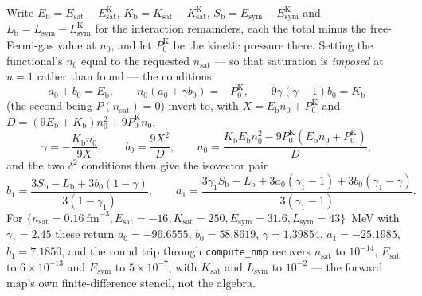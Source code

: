 \documentclass[aps,prc,onecolumn,superscriptaddress,nofootinbib,10pt]{revtex4-2}
\newcommand{\nsat}{n_{\mathrm{sat}}}
\begin{document}
Write $E_{\mathrm{b}} = E_{\mathrm{sat}} - E_{\mathrm{sat}}^{\mathrm{K}}$,
$K_{\mathrm{b}} = K_{\mathrm{sat}} - K_{\mathrm{sat}}^{\mathrm{K}}$,
$S_{\mathrm{b}} = E_{\mathrm{sym}} - E_{\mathrm{sym}}^{\mathrm{K}}$ and
$L_{\mathrm{b}} = L_{\mathrm{sym}} - L_{\mathrm{sym}}^{\mathrm{K}}$ for the
interaction remainders, each the total minus the free-Fermi-gas value at
$n_0$, and let $P^{\mathrm{K}}_0$ be the kinetic pressure there. Setting the
functional's $n_0$ equal to the requested $\nsat$ --- so that saturation is
\emph{imposed} at $u = 1$ rather than found --- the conditions
%
\begin{equation}
a_0 + b_0 = E_{\mathrm{b}}, \qquad
n_0 (a_0 + \gamma b_0) = -P^{\mathrm{K}}_0, \qquad
9 \gamma (\gamma - 1) b_0 = K_{\mathrm{b}}
\label{eq:isoscalar_conditions}
\end{equation}
%
(the second being $P(\nsat) = 0$) invert to, with
$X = E_{\mathrm{b}} n_0 + P^{\mathrm{K}}_0$ and
$D = (9 E_{\mathrm{b}} + K_{\mathrm{b}}) n_0^2 + 9 P^{\mathrm{K}}_0 n_0$,
%
\begin{equation}
\gamma = -\frac{K_{\mathrm{b}} n_0}{9 X}, \qquad
b_0 = \frac{9 X^2}{D}, \qquad
a_0 = \frac{K_{\mathrm{b}} E_{\mathrm{b}} n_0^2
      - 9 P^{\mathrm{K}}_0 (E_{\mathrm{b}} n_0 + P^{\mathrm{K}}_0)}{D} ,
\label{eq:invert_isoscalar}
\end{equation}
%
and the two $\delta^2$ conditions then give the isovector pair
%
\begin{equation}
b_1 = \frac{3 S_{\mathrm{b}} - L_{\mathrm{b}} + 3 b_0 (1 - \gamma)}
           {3 (1 - \gamma_1)}, \qquad
a_1 = \frac{3 \gamma_1 S_{\mathrm{b}} - L_{\mathrm{b}}
       + 3 a_0 (\gamma_1 - 1) + 3 b_0 (\gamma_1 - \gamma)}{3 (\gamma_1 - 1)} .
\label{eq:invert_isovector}
\end{equation}
%
For $\{\nsat = 0.16~\mathrm{fm}^{-3}, E_{\mathrm{sat}} = -16,
K_{\mathrm{sat}} = 250, E_{\mathrm{sym}} = 31.6, L_{\mathrm{sym}} = 43\}$~MeV
with $\gamma_1 = 2.45$ these return $a_0 = -96.6555$, $b_0 = 58.8619$,
$\gamma = 1.39854$, $a_1 = -25.1985$, $b_1 = 7.1850$, and the round trip
through \texttt{compute\_nmp} recovers $\nsat$ to $10^{-14}$,
$E_{\mathrm{sat}}$ to $6 \times 10^{-13}$ and $E_{\mathrm{sym}}$ to
$5 \times 10^{-7}$, with $K_{\mathrm{sat}}$ and $L_{\mathrm{sym}}$ to $10^{-2}$
--- the forward map's own finite-difference stencil, not the algebra.
\end{document}
